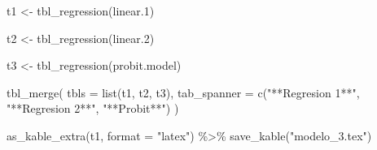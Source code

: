\documentclass[
  letterpaper,
  DIV=11,
  numbers=noendperiod]{scrartcl}
\newenvironment{Shaded}{\begin{snugshade}}{\end{snugshade}}
\newcommand{\AttributeTok}[1]{\textcolor[rgb]{0.40,0.45,0.13}{#1}}
\newcommand{\FloatTok}[1]{\textcolor[rgb]{0.68,0.00,0.00}{#1}}
\newcommand{\FunctionTok}[1]{\textcolor[rgb]{0.28,0.35,0.67}{#1}}
\newcommand{\NormalTok}[1]{\textcolor[rgb]{0.00,0.23,0.31}{#1}}
\newcommand{\OtherTok}[1]{\textcolor[rgb]{0.00,0.23,0.31}{#1}}
\newcommand{\SpecialCharTok}[1]{\textcolor[rgb]{0.37,0.37,0.37}{#1}}
\newcommand{\StringTok}[1]{\textcolor[rgb]{0.13,0.47,0.30}{#1}}
\begin{document}
\begin{Shaded}
\begin{Highlighting}[]
\NormalTok{t1 }\OtherTok{\textless{}{-}} \FunctionTok{tbl\_regression}\NormalTok{(linear}\FloatTok{.1}\NormalTok{)}

\NormalTok{t2 }\OtherTok{\textless{}{-}} \FunctionTok{tbl\_regression}\NormalTok{(linear}\FloatTok{.2}\NormalTok{)}

\NormalTok{t3 }\OtherTok{\textless{}{-}} \FunctionTok{tbl\_regression}\NormalTok{(probit.model)}

\FunctionTok{tbl\_merge}\NormalTok{(}
  \AttributeTok{tbls =} \FunctionTok{list}\NormalTok{(t1, t2, t3),}
  \AttributeTok{tab\_spanner =} \FunctionTok{c}\NormalTok{(}\StringTok{"**Regresion 1**"}\NormalTok{, }\StringTok{"**Regresion 2**"}\NormalTok{, }\StringTok{"**Probit**"}\NormalTok{)}
\NormalTok{)}

\FunctionTok{as\_kable\_extra}\NormalTok{(t1, }\AttributeTok{format =} \StringTok{"latex"}\NormalTok{) }\SpecialCharTok{\%\textgreater{}\%}
  \FunctionTok{save\_kable}\NormalTok{(}\StringTok{"modelo\_3.tex"}\NormalTok{)}
\end{Highlighting}
\end{Shaded}
\end{document}
